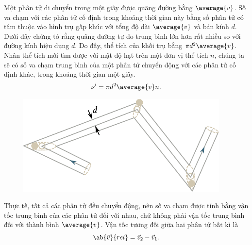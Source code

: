 Một phân tử di chuyển trong một giây được quãng đường bằng $\average{v}$. Số va chạm với các phân tử cố định trong khoảng thời gian này bằng số phân tử có tâm thuộc vào hình trụ gấp khúc với tổng độ dài $\average{v}$ và bán kính $d$. Dưới đây chứng tỏ rằng quãng đường tự do trung bình lớn hơn rất nhiều so với đường kính hiệu dụng $d$. Do đấy, thể tích của khối trụ bằng $\pi d^2\average{v}$. Nhân thể tích mới tìm được với mật độ hạt trên một đơn vị thể tích $n$, chúng ta sẽ có số va chạm trung bình của một phân tử chuyển động với các phân tử cố định khác, trong khoảng thời gian một giây.
\begin{equation}\label{eq:16_8}
    \nu' = \pi d^2 \average{v} n.
\end{equation}

\begin{figure}[!htb]
	\begin{center}
		\includegraphics[scale=1]{figures/ch_16/fig_16_5.pdf}
		\caption[]{}
		\label{fig:16_5}
	\end{center}
\end{figure}

Thực tế, tất cả các phân tử đều chuyển động, nên số va chạm được tính bằng vận tốc trung bình của các phân tử đối với nhau, chứ không phải vận tốc trung bình đối với thành bình $\average{v}$. Vận tốc tương đối giữa hai phân tử bất kì là
\begin{equation*}
    \ab{\vec{v}}{rel} = \vec{v}_2 - \vec{v}_1.
\end{equation*}

